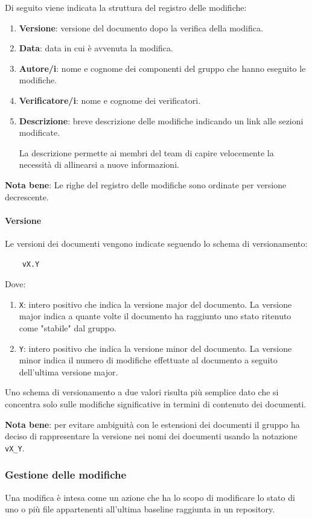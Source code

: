 Di seguito viene indicata la struttura del registro delle modifiche:
\begin{enumerate}
    \item \textbf{Versione}: versione del documento dopo la verifica della modifica.
    \item \textbf{Data}: data in cui è avvenuta la modifica.
    \item \textbf{Autore/i}: nome e cognome dei componenti del gruppo che hanno eseguito le modifiche.
    \item \textbf{Verificatore/i}: nome e cognome dei verificatori.
    \item \textbf{Descrizione}: breve descrizione delle modifiche indicando un link alle sezioni modificate.
    
    La descrizione permette ai membri del team di capire velocemente la necessità di allinearsi a nuove informazioni. 
\end{enumerate} 
\textbf{Nota bene}: Le righe del registro delle modifiche sono ordinate per versione decrescente.

\paragraph{Versione}
\label{par:versione_documenti}
Le versioni dei documenti vengono indicate seguendo lo schema di versionamento:
\begin{lstlisting}
    vX.Y
\end{lstlisting}
Dove:
\begin{enumerate}
    \item \texttt{X}: intero positivo che indica la versione major del documento.
    La versione major indica a quante volte il documento ha raggiunto uno stato ritenuto come "stabile" dal gruppo.

    \item \texttt{Y}: intero positivo che indica la versione minor del documento.
    La versione minor indica il numero di modifiche effettuate al documento a seguito dell'ultima versione major.
\end{enumerate}
Uno schema di versionamento a due valori risulta più semplice dato che si concentra solo sulle modifiche significative in termini di contenuto dei documenti.

\textbf{Nota bene}: per evitare ambiguità con le estensioni dei documenti il gruppo ha deciso di rappresentare la versione nei nomi dei documenti usando la notazione \texttt{vX\_Y}.

\subsubsection{Gestione delle modifiche}
Una modifica è intesa come un azione che ha lo scopo di modificare lo stato di uno o più file appartenenti all'ultima baseline raggiunta in un repository. 

